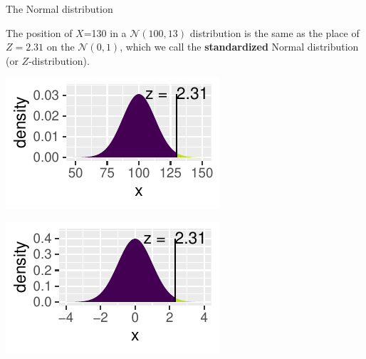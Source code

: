 \documentclass[10pt]{beamer}\usepackage[]{graphicx}\usepackage[]{color}
\newenvironment{knitrout}{}{} %
\begin{document}
\begin{frame}[fragile]{The Normal distribution}
	
	\vspace*{-.01in}
	
	\small{The position of $X$=130 in a $\mathcal{N}(100,13)$ distribution is the same as
		the place of $Z=2.31$ on the $\mathcal{N}(0,1)$, which we call the \textbf{standardized} Normal distribution (or	$Z$-distribution).}
	
	
\begin{knitrout}\tiny
{}\color{fgcolor}

{\centering \includegraphics[width=0.55\linewidth]{figure/probs-1} 

}




{\centering \includegraphics[width=0.55\linewidth]{figure/probs-2} 

}



\end{knitrout}
	
\end{frame} 

\end{document}
